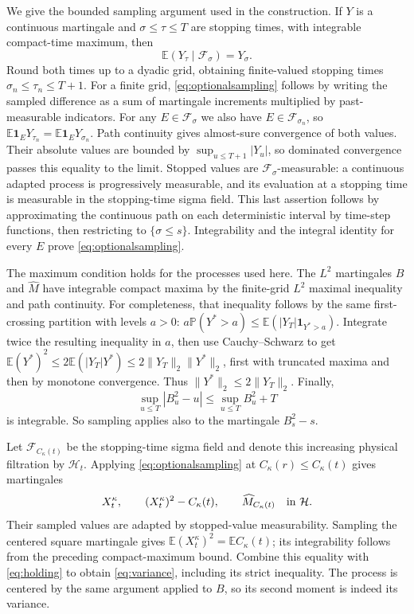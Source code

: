 \documentclass[11pt]{article}
\newcommand{\E}{\mathbb E}
\newcommand{\Pp}{\mathbb P}
\newcommand{\ind}{\mathbf1}
\newcommand{\F}{\mathcal F}
\begin{document}
We give the bounded sampling argument used in the construction.
If $Y$ is a continuous martingale and $\sigma\leq\tau\leq T$
are stopping times, with integrable compact-time maximum, then
\begin{equation}\label{eq:optionalsampling}
 \E(Y_\tau\mid\F_\sigma)=Y_\sigma.
\end{equation}
Round both times up to a dyadic grid, obtaining finite-valued
stopping times $\sigma_n\leq\tau_n\leq T+1$. For a finite grid,
\eqref{eq:optionalsampling} follows by writing the sampled difference
as a sum of martingale increments multiplied by past-measurable
indicators. For any $E\in\F_\sigma$ we also have
$E\in\F_{\sigma_n}$, so
$\E\ind_EY_{\tau_n}=\E\ind_EY_{\sigma_n}$.
Path continuity gives almost-sure convergence of both values.
Their absolute values are bounded by
$\sup_{u\leq T+1}|Y_u|$, so dominated convergence passes this equality
to the limit. Stopped values are $\F_\sigma$-measurable: a continuous
adapted process is progressively measurable, and its evaluation at
a stopping time is measurable in the stopping-time sigma field.
This last assertion follows by approximating the continuous path on
each deterministic interval by time-step functions, then restricting
to $\{\sigma\leq s\}$. Integrability and the integral identity for
every $E$ prove \eqref{eq:optionalsampling}.

The maximum condition holds for the processes used here. The $L^2$
martingales $B$ and $\widehat M$ have integrable compact maxima by
the finite-grid $L^2$ maximal inequality and path continuity.
For completeness, that inequality follows by the same first-crossing
partition with levels $a>0$:
$a\Pp(Y^*>a)\leq\E(|Y_T|\ind_{Y^*>a})$.
Integrate twice the resulting inequality in $a$, then use
Cauchy--Schwarz to get
$\E(Y^*)^2\leq2\E(|Y_T|Y^*)\leq
2\|Y_T\|_2\|Y^*\|_2$, first with truncated maxima and then by
monotone convergence. Thus $\|Y^*\|_2\leq2\|Y_T\|_2$.
Finally,
\[
 \sup_{u\leq T}|B_u^2-u|\leq\sup_{u\leq T}B_u^2+T
\]
is integrable. So sampling applies also to the martingale $B_s^2-s$.

Let $\F_{C_\kappa(t)}$ be the stopping-time sigma field and denote
this increasing physical filtration by $\mathcal H_t$. Applying
\eqref{eq:optionalsampling} at $C_\kappa(r)\leq C_\kappa(t)$ gives
martingales
\begin{equation}\label{eq:physicalmart}
 X_t^\kappa,\qquad
 (X_t^\kappa)^2-C_\kappa(t),\qquad
 \widehat M_{C_\kappa(t)}
 \quad\hbox{in }\mathcal H.
\end{equation}
Their sampled values are adapted by stopped-value measurability.
Sampling the centered square martingale gives
$\E(X_t^\kappa)^2=\E C_\kappa(t)$; its integrability follows from
the preceding compact-maximum bound. Combine this equality with
\eqref{eq:holding} to obtain \eqref{eq:variance}, including its strict
inequality. The process is centered by the same argument applied to
$B$, so its second moment is indeed its variance.
\end{document}
